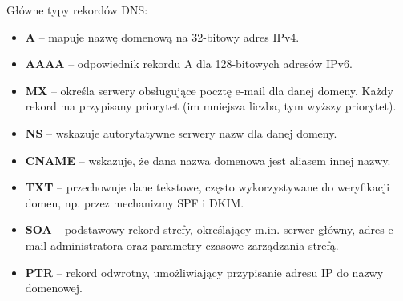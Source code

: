 \documentclass[11pt,a4paper]{article}
\begin{document}
Główne typy rekordów DNS:
\begin{itemize}
    \item \textbf{A} -- mapuje nazwę domenową na 32-bitowy adres IPv4.
    \item \textbf{AAAA} -- odpowiednik rekordu A dla 128-bitowych adresów IPv6.
    \item \textbf{MX} -- określa serwery obsługujące pocztę e-mail dla danej domeny. Każdy rekord ma przypisany priorytet (im mniejsza liczba, tym wyższy priorytet).
    \item \textbf{NS} -- wskazuje autorytatywne serwery nazw dla danej domeny.
    \item \textbf{CNAME} -- wskazuje, że dana nazwa domenowa jest aliasem innej nazwy.
    \item \textbf{TXT} -- przechowuje dane tekstowe, często wykorzystywane do weryfikacji domen, np. przez mechanizmy SPF i DKIM.
    \item \textbf{SOA} -- podstawowy rekord strefy, określający m.in. serwer główny, adres e-mail administratora oraz parametry czasowe zarządzania strefą.
    \item \textbf{PTR} -- rekord odwrotny, umożliwiający przypisanie adresu IP do nazwy domenowej.
\end{itemize}
\end{document}
